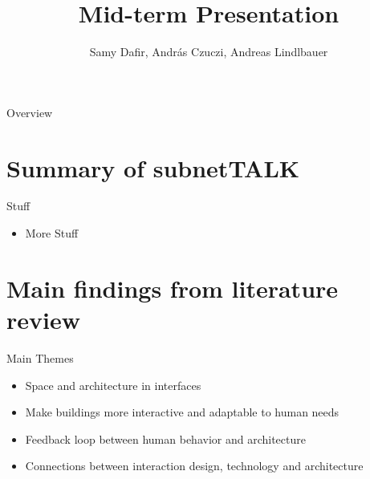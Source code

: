 \documentclass[10pt]{beamer}
\title{Mid-term Presentation}
\author{Samy Dafir, András Czuczi, Andreas Lindlbauer} %
\date{}
\begin{document}
\begin{frame}
	\maketitle 
\end{frame}


\begin{frame}{Overview}
	\tableofcontents
\end{frame}


\section{Summary of subnetTALK}


\begin{frame}{Stuff}
	\begin{itemize}
        \pause{}
		\item More Stuff
	\end{itemize}	
\end{frame}


\section{Main findings from literature review}


\begin{frame}{Main Themes}
	\begin{itemize}
		\item Space and architecture in interfaces
        \pause{}
		\item Make buildings more interactive and adaptable to human needs
        \pause{}
		\item Feedback loop between human behavior and architecture
        \pause{}
		\item Connections between interaction design, technology and architecture
	\end{itemize}	
\end{frame}
\end{document}
